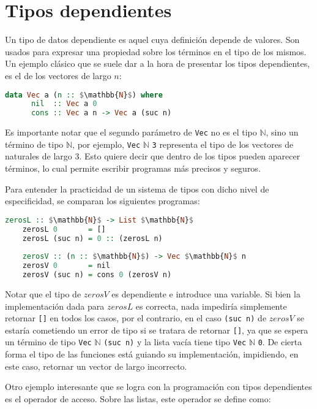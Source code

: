 \section{Tipos dependientes}

Un tipo de datos dependiente es aquel cuya definición depende de valores.
Son usados para expresar una propiedad sobre los términos en el tipo de los mismos.
Un ejemplo clásico que se suele dar a la hora de presentar los tipos dependientes, es el de los vectores de largo $n$:

\begin{lstlisting}[mathescape, language=Haskell]
  	data Vec a (n :: $\mathbb{N}$) where
	  nil  :: Vec a 0
	  cons :: Vec a n -> Vec a (suc n)
\end{lstlisting}

Es importante notar que el segundo parámetro de \verb|Vec| no es el tipo $\mathbb{N}$, sino un término de tipo $\mathbb{N}$, por ejemplo, \verb|Vec| $\mathbb{N}$ \verb|3| representa el tipo de los vectores de naturales de largo 3.
Esto quiere decir que dentro de los tipos pueden aparecer términos, lo cual permite escribir programas más precisos y seguros.

Para entender la practicidad de un sistema de tipos con dicho nivel de especificidad, se comparan los siguientes programas:
\begin{lstlisting}[mathescape, language=Haskell]
	zerosL :: $\mathbb{N}$ -> List $\mathbb{N}$
	zerosL 0       = []
	zerosL (suc n) = 0 :: (zerosL n)
	
	zerosV :: (n :: $\mathbb{N}$) -> Vec $\mathbb{N}$ n
	zerosV 0       = nil
	zerosV (suc n) = cons 0 (zerosV n)
\end{lstlisting}

Notar que el tipo de $zerosV$ es dependiente e introduce una variable.
Si bien la implementación dada para $zerosL$ es correcta, nada impediría simplemente retornar \verb|[]| en todos los casos, por el contrario, en el caso \verb|(suc n)| de $zerosV$ se estaría cometiendo un error de tipo si se tratara de retornar \verb|[]|, ya que se espera un término de tipo \verb|Vec| $\mathbb{N}$ \verb|(suc n)| y la lista vacía tiene tipo \verb|Vec| $\mathbb{N}$ \verb|0|.
De cierta forma el tipo de las funciones está guiando su implementación, impidiendo, en este caso, retornar un vector de largo incorrecto.

Otro ejemplo interesante que se logra con la programación con tipos dependientes es el operador de acceso. Sobre las listas, este operador se define como:


